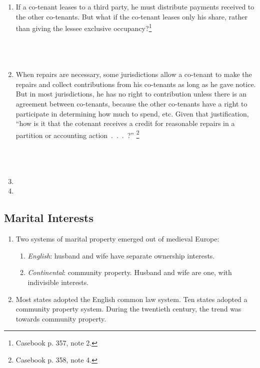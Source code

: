 \begin{enumerate}
    \item If a co-tenant leases to a third party, he must distribute payments 
    received to the other co-tenants. But what if the co-tenant leases only 
    his share, rather than giving the lessee exclusive 
    occupancy?\footnote{Casebook p. 357, note 2.}
    ~\\\\\\\\ %
    \item When repairs are necessary, some jurisdictions allow a co-tenant to 
    make the repairs and collect contributions from his co-tenants as long as 
    he gave notice. But in most jurisdictions, he has no right to contribution 
    unless there is an agreement between co-tenants, because the other 
    co-tenants have a right to participate in determining how much to spend, 
    etc. Given that justification, ``how is it that the cotenant receives a 
    credit for reasonable repairs in a partition or accounting 
    action~.~.~.~?'' \footnote{Casebook p. 358, note 4.}
    ~\\\\\\\\ %
    \item  %
    \item %

\end{enumerate}

\subsection{Marital Interests}

\begin{enumerate}
    \item Two systems of marital property emerged out of medieval Europe:
    \begin{enumerate}
        \item \emph{English}: husband and wife have separate ownership 
        interests.
        \item \emph{Continental}: community property. Husband and wife are 
        one, with indivisible interests.
    \end{enumerate}
    \item Most states adopted the English common law system. Ten states 
    adopted a community property system. During the twentieth century, the 
    trend was towards community property.
\end{enumerate}

